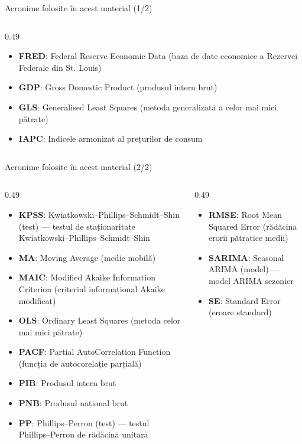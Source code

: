 \begin{frame}{Acronime folosite în acest material (1/2)}
\begin{columns}[T]
\begin{column}{0.49\textwidth}
\begin{itemize}
    \item \textbf{FRED}: Federal Reserve Economic Data (baza de date economice a Rezervei Federale din St. Louis)
    \item \textbf{GDP}: Gross Domestic Product (produsul intern brut)
    \item \textbf{GLS}: Generalised Least Squares (metoda generalizată a celor mai mici pătrate)
    \item \textbf{IAPC}: Indicele armonizat al prețurilor de consum
\end{itemize}
\end{column}
\end{columns}
\end{frame}
\begin{frame}{Acronime folosite în acest material (2/2)}
\begin{columns}[T]
\begin{column}{0.49\textwidth}
\begin{itemize}\setlength{\itemsep}{0pt}
    \item \textbf{KPSS}: Kwiatkowski–Phillips–Schmidt–Shin (test) — testul de staționaritate Kwiatkowski–Phillips–Schmidt–Shin
    \item \textbf{MA}: Moving Average (medie mobilă)
    \item \textbf{MAIC}: Modified Akaike Information Criterion (criteriul informațional Akaike modificat)
    \item \textbf{OLS}: Ordinary Least Squares (metoda celor mai mici pătrate)
    \item \textbf{PACF}: Partial AutoCorrelation Function (funcția de autocorelație parțială)
    \item \textbf{PIB}: Produsul intern brut
    \item \textbf{PNB}: Produsul național brut
    \item \textbf{PP}: Phillips–Perron (test) — testul Phillips–Perron de rădăcină unitară
\end{itemize}
\end{column}
\begin{column}{0.49\textwidth}
\begin{itemize}\setlength{\itemsep}{0pt}
    \item \textbf{RMSE}: Root Mean Squared Error (rădăcina erorii pătratice medii)
    \item \textbf{SARIMA}: Seasonal ARIMA (model) — model ARIMA sezonier
    \item \textbf{SE}: Standard Error (eroare standard)

\end{itemize}
\end{column}
\end{columns}
\end{frame}
